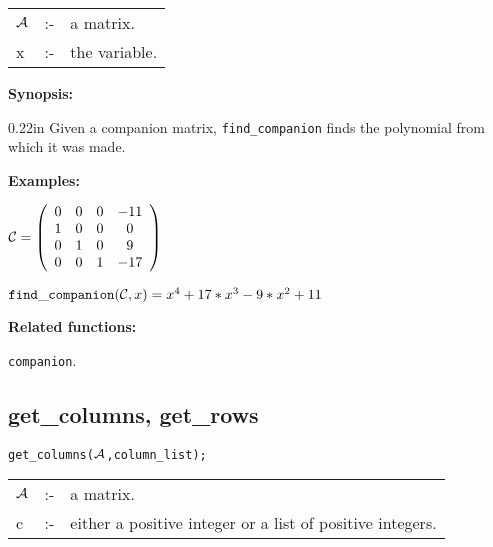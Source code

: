 \hspace*{0.1in}
\begin{tabular}{l l l}
${\cal A}$ &:-& a matrix. \\
x          &:-& the variable.
\end{tabular}

{\bf Synopsis:}

\begin{addtolength}{\leftskip}{0.22in}
  Given a companion matrix, {\tt find\_companion} finds the polynomial
from which it was made.

\end{addtolength}


{\bf Examples:}

\begin{flushleft}
\hspace*{0.175in}
\begin{math}
{\cal C} = \left( \begin{array}{cccc} 0 & 0 & 0 & -11 \\ 1 & 0 & 0 & 0
\\ 0 & 1 & 0 & 9 \\ 0 & 0 & 1 & -17
\end{array} \right)
\end{math}
\end{flushleft}

\vspace*{3mm}

\begin{flushleft}
\hspace*{0.175in}
\begin{math}
{\tt find\_companion}({\cal C},x) = x^4+17*x^3-9*x^2+11
\end{math}
\end{flushleft}

\vspace*{3mm}

{\bf Related functions:}

\hspace*{0.175in} {\tt companion}.

\subsection{get\_columns, get\_rows}


\hspace*{0.175in} {\tt get\_columns(${\cal A}$,column\_list);}

\hspace*{0.1in}
\begin{tabular}{l l l}
${\cal A}$ &:-& a matrix. \\
c          &:-& either a positive integer or a list of positive
                integers.
\end{tabular}

